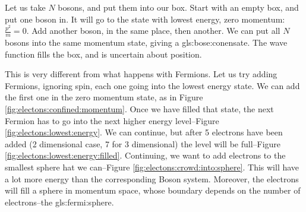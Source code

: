 \documentclass[]{article}
\begin{document}
Let us take $N$ bosons, and put them into our box. Start with an empty box, and put one boson in. It will go to the state with lowest energy, zero momentum: $\frac{p^2}{m}=0$. Add another boson, in the same place, then another. We can put all $N$ bosons into the same momentum state, giving a \gls{gls:bose:conensate}. The wave function fills the box, and is uncertain about position.


This is very different from what happens with Fermions. Let us try adding Fermions, ignoring spin, each one going into the lowest energy state. We can add the first one in the zero momentum state, as in Figure \ref{fig:electons:confined:momentum}. Once we have filled that state, the next Fermion has to go into the next higher energy level--Figure \ref{fig:electons:lowest:energy}. We can continue, but after 5 electrons have been added (2 dimensional case, 7 for 3 dimensional) the level will be full--Figure \ref{fig:electons:lowest:energy:filled}. Continuing, we want to add electrons to the smallest sphere hat we can--Figure \ref{fig:electons:crowd:into:sphere}. This will have a lot more energy than the corresponding Boson system. Moreover, the electrons will fill a sphere in momentum space, whose boundary depends on the number of electrons--the \gls{gls:fermi:sphere}. 
\end{document}
